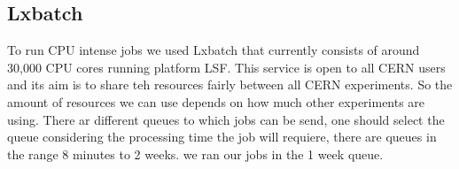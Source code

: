 \subsection{Lxbatch}
To run CPU intense jobs we used Lxbatch that currently consists of around 30,000 CPU cores running platform LSF\textregistered. This service is open to all CERN users and its aim is to share teh resources fairly between all CERN experiments. So the amount of resources we can use depends on how much other experiments are using. 
There ar different queues to which jobs can be send, one should select the queue considering the processing time the job will requiere, there are queues in the range 8 minutes to 2 weeks. we ran our jobs in the 1 week queue. 



